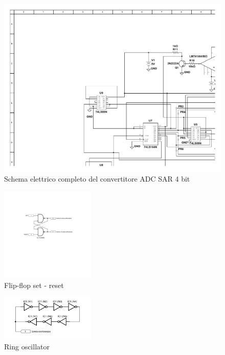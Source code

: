 \documentclass[journal]{IEEEtran}
\begin{document}
\begin{figure}[t]%
\centering
\begin{center}
\includegraphics[width=1.15\textwidth]{sch-simulations/output/SAR_4bit_cv1.pdf}
\end{center}
\caption{Schema elettrico completo del convertitore ADC SAR 4 bit}
\label{fig:sarCompleteSchematic}
\end{figure}



\begin{figure}[H]%
\begin{center}
\includegraphics[width=0.40\textwidth]{sch-simulations/output/flip-flop-RS.pdf}
\caption{Flip-flop set - reset}
\label{fig:ledp}
\end{center}
\end{figure}

\begin{figure}[H]%
\begin{center}
\includegraphics[width=0.40\textwidth]{sch-simulations/output/ring-osc-logic.pdf}
\caption{Ring oscillator}
\label{fig:ledp}
\end{center}
\end{figure}
\end{document}
